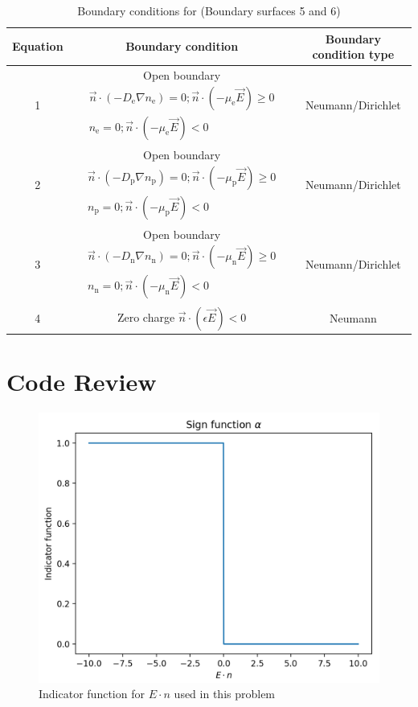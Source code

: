 \documentclass[12pt, a4paper]{report}
\begin{document}
\begin{table}[!h]
    \centering\begin{tabular}{c|c|c}
        Equation & Boundary condition & Boundary condition type\\ \hline
        1 & Open boundary $\begin{array}{c}\vec{n} \cdot\left(-D_{\mathrm{e}} \nabla n_{\mathrm{e}}\right)=0 ; \vec{n} \cdot\left(-\mu_{\mathrm{e}} \vec{E}\right) \geqslant 0 \\ n_{\mathrm{e}}=0 ; \vec{n} \cdot\left(-\mu_{\mathrm{e}} \vec{E}\right)<0\end{array} $ & Neumann/Dirichlet \\ \hline
        2 & Open boundary $\begin{array}{c}\vec{n} \cdot\left(-D_{\mathrm{p}} \nabla n_{\mathrm{p}}\right)=0 ; \vec{n} \cdot\left(-\mu_{\mathrm{p}} \vec{E}\right) \geqslant 0 \\ n_{\mathrm{p}}=0 ; \vec{n} \cdot\left(-\mu_{\mathrm{p}} \vec{E}\right)<0\end{array} $   & Neumann/Dirichlet \\ \hline
        3 & Open boundary $\begin{array}{c}\vec{n} \cdot\left(-D_{\mathrm{n}} \nabla n_{\mathrm{n}}\right)=0 ; \vec{n} \cdot\left(-\mu_{\mathrm{n}} \vec{E}\right) \geqslant 0 \\ n_{\mathrm{n}}=0 ; \vec{n} \cdot\left(-\mu_{\mathrm{n}} \vec{E}\right)<0\end{array} $  & Neumann/Dirichlet\\ \hline
        4 & Zero charge $\vec{n} \cdot\left(\epsilon \vec{E}\right)<0$ & Neumann \\ \hline

    \end{tabular}
    \caption{Boundary conditions for  (Boundary surfaces 5 and 6)}
\end{table}

\section{\bf \large Code Review}



\begin{figure}[!h]
    \centering
    \includegraphics*[width=.8\linewidth]{indicator_fcn.png}
    \caption{Indicator function for $E \cdot n$ used in this problem}
\end{figure}
\end{document}
